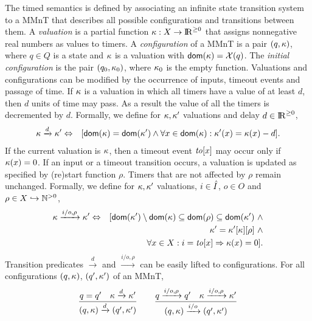 The timed semantics is defined by associating an infinite state transition system to a MMnT that describes all possible
configurations and transitions between them.
A \emph{valuation} is a partial function
$\kappa : X \rightarrow {\rm I\!R}^{\geq 0}$ that assigns nonnegative real numbers as values to timers.
A \emph{configuration} of a MMnT is a pair $(q,\kappa)$, where $q \in Q$ is a state and $\kappa$ is a valuation
with ${\textsf{dom}}(\kappa) =  \mathcal{X}(q)$.
The \emph{initial configuration} is the pair $(q_0, \kappa_0)$, where $\kappa_0$ is the empty function.
Valuations and configurations can be modified by the occurrence of inputs, timeout events and passage of time.
If $\kappa$ is a valuation in which all timers
have a value of at least $d$, then $d$ units of time may pass. As a result the value of all the timers is decremented by $d$.
Formally, we define for $\kappa, \kappa'$ valuations and delay $d \in {\rm I\!R}^{\geq 0}$,
\begin{eqnarray*}
\kappa \xrightarrow{d} \kappa' & \Leftrightarrow & [{\textsf{dom}}(\kappa) = {\textsf{dom}}(\kappa') \wedge \forall x \in{\textsf{dom}}(\kappa) : \kappa'(x) = \kappa(x) - d ].
\end{eqnarray*}
If the current valuation is $\kappa$, then a timeout event $\mathit{to}[x]$ may occur only if $\kappa(x)=0$.
If an input or a timeout transition occurs, a valuation is updated as specified by (re)start function $\rho$.
Timers that are not affected by $\rho$ remain unchanged.
Formally, we define for $\kappa, \kappa'$ valuations, $i \in \hat{I}$, $o \in O$ and $\rho \in X \hookrightarrow {\mathbb N}^{>0}$,
\begin{eqnarray*}
\kappa \xrightarrow{i/o, \rho}  \kappa' & \Leftrightarrow & [ {\textsf{dom}}(\kappa') \setminus {\textsf{dom}}(\kappa)  \subseteq {\textsf{dom}}(\rho) \subseteq {\textsf{dom}}(\kappa') ~ \wedge\\
&& \kappa' =  \kappa'[\kappa][\rho] ~ \wedge \\
&& \forall x \in X : i=\mathit{to}[x] \Rightarrow \kappa(x) = 0].
\end{eqnarray*}
Transition predicates $\xrightarrow{d}$ and $\xrightarrow{i/o, \rho}$ can be easily lifted to configurations.
For all configurations $(q, \kappa)$, $(q', \kappa')$ of an MMnT,
\[
\frac{q = q' \quad \kappa \xrightarrow{d} \kappa'}{(q,\kappa) \xrightarrow{d} (q',\kappa')}
\quad\quad
  \frac{q \xrightarrow{i/o,\rho} q' \quad \kappa \xrightarrow{i/o, \rho} \kappa'}{(q,\kappa) \xrightarrow{i/o} (q',\kappa')}
\]
